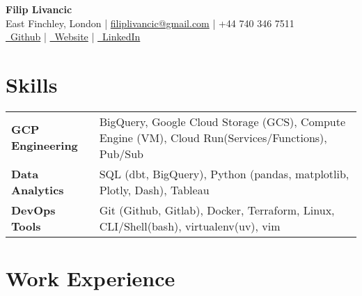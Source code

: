 \documentclass[a4paper, 10pt]{article}
\date{}
\begin{document}
\vspace*{-9.0mm}

\begin{center}
    {\LARGE \textbf{Filip Livancic}} \\[1mm]
    \vspace{-0mm}
    East Finchley, London \quad | \quad 
    \href{mailto:filiplivancic@gmail.com}{filiplivancic@gmail.com} \quad | \quad 
    +44 740 346 7511 \\
    \href{https://github.com/Filpill/}{\faGithub\ Github} \quad | \quad 
    \href{https://filiplivancic.com/}{\faGlobe\ Website} \quad | \quad 
    \href{https://linkedin.com/in/filip-livancic/}{\faLinkedinSquare\ LinkedIn}
\end{center}\vspace{-6.5mm}

\section*{Skills}
\vspace{-7.5mm}

\begin{table}[h!]
\centering
\renewcommand{\arraystretch}{1.2}
\begin{tabular}{@{} l p{17.2cm} @{}}
  \textbf{GCP Engineering} & BigQuery, Google Cloud Storage (GCS), Compute Engine (VM), Cloud Run(Services/Functions), Pub/Sub\\
  \textbf{Data Analytics} & SQL (dbt, BigQuery), Python (pandas, matplotlib, Plotly, Dash), Tableau\\
  \textbf{DevOps Tools} & Git (Github, Gitlab), Docker, Terraform, Linux, CLI/Shell(bash), virtualenv(uv), vim\\
\end{tabular}
\end{table}

\vspace{-7.5mm}

\section*{Work Experience}
\vspace{-2.5mm}
\end{document}
